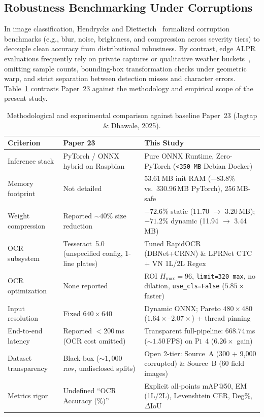 \documentclass[pdflatex,sn-mathphys-num]{sn-jnl}
\begin{document}
\subsection{Robustness Benchmarking Under Corruptions}
In image classification, Hendrycks and Dietterich~\cite{hendrycks2019benchmarking} formalized corruption benchmarks (e.g., blur, noise, brightness, and compression across severity tiers) to decouple clean accuracy from distributional robustness. By contrast, edge ALPR evaluations frequently rely on private captures or qualitative weather buckets~\cite{jagtap2025yolo}, omitting sample counts, bounding-box transformation checks under geometric warp, and strict separation between detection misses and character errors. Table~\ref{tab:paper23_comparison} contrasts Paper~23 against the methodology and empirical scope of the present study.

\begin{table}[t]
\centering
\caption{Methodological and experimental comparison against baseline Paper~23 (Jagtap \& Dhawale, 2025).}\label{tab:paper23_comparison}
\footnotesize
\begin{tabular}{@{}p{2.7cm}p{4.3cm}p{5.0cm}@{}}
\toprule
\textbf{Criterion} & \textbf{Paper 23~\cite{jagtap2025yolo}} & \textbf{This Study} \\
\midrule
Inference stack & PyTorch / ONNX hybrid on Raspbian & Pure ONNX Runtime, Zero-PyTorch (\texttt{<350\,MB} Debian Docker) \\
Memory footprint & Not detailed & 53.61\,MB init RAM ($-83.8\%$ vs.\ 330.96\,MB PyTorch), 256\,MB-safe \\
Weight compression & Reported $\sim 40\%$ size reduction & $-72.6\%$ static (11.70 $\rightarrow$ 3.20\,MB); $-71.2\%$ dynamic (11.94 $\rightarrow$ 3.44\,MB) \\
OCR subsystem & Tesseract~5.0 (unspecified config, 1-line plates) & Tuned RapidOCR (DBNet+CRNN) \& LPRNet CTC + VN 1L/2L Regex \\
OCR optimization & None reported & ROI $H_{\max}=96$, \texttt{limit=320 max}, no dilation, \texttt{use\_cls=False} ($5.85\times$ faster) \\
Input resolution & Fixed $640\times 640$ & Dynamic ONNX; Pareto $480\times 480$ ($1.64\times$--$2.07\times$) + thread pinning \\
End-to-end latency & Reported $<200$\,ms (OCR cost omitted) & Transparent full-pipeline: 668.74\,ms ($\sim 1.50$\,FPS) on Pi~4 ($6.26\times$ gain) \\
Dataset transparency & Black-box ($\sim 1,000$ raw, undisclosed splits) & Open 2-tier: Source~A (300 + 9,000 corrupted) \& Source~B (60 field images) \\
Metrics rigor & Undefined ``OCR Accuracy (\%)'' & Explicit all-points mAP@50, EM (1L/2L), Levenshtein CER, Deg\%, $\Delta\text{IoU}$ \\
\bottomrule
\end{tabular}
\end{table}
\end{document}

